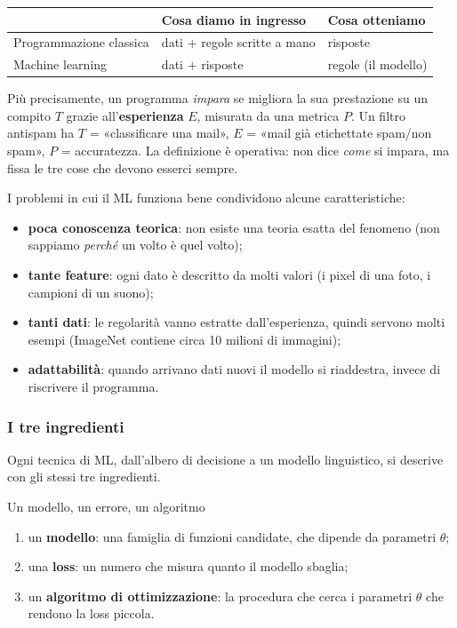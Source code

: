\documentclass[12pt]{extarticle}
\begin{document}
\begin{center}
\small
\begin{tabular}{@{}lll@{}}
\toprule
 & \textbf{Cosa diamo in ingresso} & \textbf{Cosa otteniamo} \\
\midrule
Programmazione classica & dati $+$ regole scritte a mano & risposte \\
Machine learning & dati $+$ risposte & regole (il modello) \\
\bottomrule
\end{tabular}
\end{center}

\noindent Più precisamente, un programma \emph{impara} se migliora la sua prestazione su un compito $T$ grazie all'\textbf{esperienza} $E$, misurata da una metrica $P$. Un filtro antispam ha $T$ = «classificare una mail», $E$ = «mail già etichettate spam/non spam», $P$ = accuratezza. La definizione è operativa: non dice \emph{come} si impara, ma fissa le tre cose che devono esserci sempre.

\noindent I problemi in cui il ML funziona bene condividono alcune caratteristiche:
\begin{itemize}
    \item \textbf{poca conoscenza teorica}: non esiste una teoria esatta del fenomeno (non sappiamo \emph{perché} un volto è quel volto);
    \item \textbf{tante feature}: ogni dato è descritto da molti valori (i pixel di una foto, i campioni di un suono);
    \item \textbf{tanti dati}: le regolarità vanno estratte dall'esperienza, quindi servono molti esempi (ImageNet contiene circa 10 milioni di immagini);
    \item \textbf{adattabilità}: quando arrivano dati nuovi il modello si riaddestra, invece di riscrivere il programma.
\end{itemize}

\subsubsection{I tre ingredienti}

\noindent Ogni tecnica di ML, dall'albero di decisione a un modello linguistico, si descrive con gli stessi tre ingredienti.

\begin{ideabox}{Un modello, un errore, un algoritmo}
\begin{enumerate}[1.]
    \item un \textbf{modello}: una famiglia di funzioni candidate, che dipende da parametri $\theta$;
    \item una \textbf{loss}: un numero che misura quanto il modello sbaglia;
    \item un \textbf{algoritmo di ottimizzazione}: la procedura che cerca i parametri $\theta$ che rendono la loss piccola.
\end{enumerate}
\end{ideabox}
\end{document}

